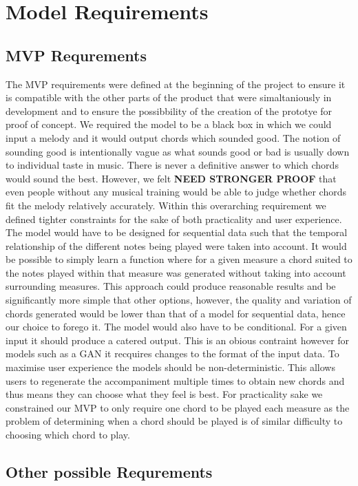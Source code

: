 \section{Model Requirements}
\subsection{MVP Requrements}

The MVP requirements were defined at the beginning of the project to ensure it is compatible with the other parts of the product that were simaltaniously in development and to ensure the possibbility of the creation of the prototye for proof of concept. 
We required the model to be a black box in which we could input a melody and it would output chords which sounded good.
The notion of sounding good is intentionally vague as what sounds good or bad is usually down to individual taste in music.
There is never a definitive answer to which chords would sound the best.
However, we felt \textbf{NEED STRONGER PROOF} that even people without any musical training would be able to judge whether chords fit the melody relatively accurately.
Within this overarching requirement we defined tighter constraints for the sake of both practicality and user experience. 
The model would have to be designed for sequential data such that the temporal relationship of the different notes being played were taken into account.
It would be possible to simply learn a function where for a given measure a chord suited to the notes played within that measure was generated without taking into account surrounding measures.
This approach could produce reasonable results and be significantly more simple that other options, however, the quality and variation of chords generated would be lower than that of a model for sequential data, hence our choice to forego it.
The model would also have to be conditional. For a given input it should produce a catered output. This is an obious contraint however for models such as a GAN it recquires changes to the format of the input data.
To maximise user experience the models should be non-deterministic. This allows users to regenerate the accompaniment multiple times to obtain new chords and thus means they can choose what they feel is best.
For practicality sake we constrained our MVP to only require one chord to be played each measure as the problem of determining when a chord should be played is of similar difficulty to choosing which chord to play.
\subsection{Other possible Requrements}

